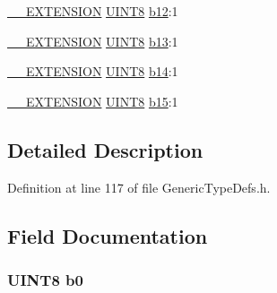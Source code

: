 \begin{DoxyCompactItemize}
\item 
\hyperlink{_generic_type_defs_8h_a6f634b0fdcc4febac630fc28e2685ddb}{\+\_\+\+\_\+\+E\+X\+T\+E\+N\+S\+I\+O\+N} \hyperlink{_generic_type_defs_8h_ab27e9918b538ce9d8ca692479b375b6a}{U\+I\+N\+T8} \hyperlink{struct_u_i_n_t16___v_a_l_1_1_____p_a_c_k_e_d_aee3c78f046a4194af2319c9385aeb73c}{b12}\+:1
\item 
\hyperlink{_generic_type_defs_8h_a6f634b0fdcc4febac630fc28e2685ddb}{\+\_\+\+\_\+\+E\+X\+T\+E\+N\+S\+I\+O\+N} \hyperlink{_generic_type_defs_8h_ab27e9918b538ce9d8ca692479b375b6a}{U\+I\+N\+T8} \hyperlink{struct_u_i_n_t16___v_a_l_1_1_____p_a_c_k_e_d_a76c0da7e433e9adfcdcdb54e32f3d209}{b13}\+:1
\item 
\hyperlink{_generic_type_defs_8h_a6f634b0fdcc4febac630fc28e2685ddb}{\+\_\+\+\_\+\+E\+X\+T\+E\+N\+S\+I\+O\+N} \hyperlink{_generic_type_defs_8h_ab27e9918b538ce9d8ca692479b375b6a}{U\+I\+N\+T8} \hyperlink{struct_u_i_n_t16___v_a_l_1_1_____p_a_c_k_e_d_a4049287a2b1dc68545460c83d657551b}{b14}\+:1
\item 
\hyperlink{_generic_type_defs_8h_a6f634b0fdcc4febac630fc28e2685ddb}{\+\_\+\+\_\+\+E\+X\+T\+E\+N\+S\+I\+O\+N} \hyperlink{_generic_type_defs_8h_ab27e9918b538ce9d8ca692479b375b6a}{U\+I\+N\+T8} \hyperlink{struct_u_i_n_t16___v_a_l_1_1_____p_a_c_k_e_d_acd1913c0ea6945ee3006ea1ea16f8c0f}{b15}\+:1
\end{DoxyCompactItemize}


\subsection{Detailed Description}


Definition at line 117 of file Generic\+Type\+Defs.\+h.



\subsection{Field Documentation}
\hypertarget{struct_u_i_n_t16___v_a_l_1_1_____p_a_c_k_e_d_a4074b3ee420d7782dce819fb031c29a2}{}
\subsubsection[{b0}]{ {\bf U\+I\+N\+T8} b0}\label{struct_u_i_n_t16___v_a_l_1_1_____p_a_c_k_e_d_a4074b3ee420d7782dce819fb031c29a2}


